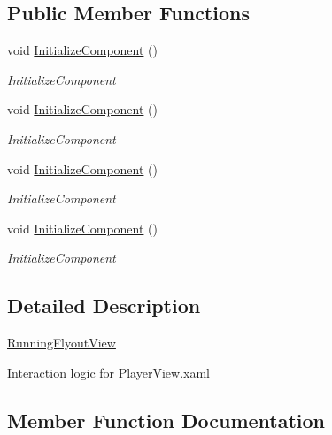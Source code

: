 \subsection*{Public Member Functions}
\begin{DoxyCompactItemize}
\item 
void \hyperlink{class_presentation_1_1_view_1_1_flyout_1_1_running_flyout_view_ac284f494bfae1a9a5f8a569710511379}{Initialize\+Component} ()
\begin{DoxyCompactList}\small\item\em Initialize\+Component \end{DoxyCompactList}\item 
void \hyperlink{class_presentation_1_1_view_1_1_flyout_1_1_running_flyout_view_ac284f494bfae1a9a5f8a569710511379}{Initialize\+Component} ()
\begin{DoxyCompactList}\small\item\em Initialize\+Component \end{DoxyCompactList}\item 
void \hyperlink{class_presentation_1_1_view_1_1_flyout_1_1_running_flyout_view_ac284f494bfae1a9a5f8a569710511379}{Initialize\+Component} ()
\begin{DoxyCompactList}\small\item\em Initialize\+Component \end{DoxyCompactList}\item 
void \hyperlink{class_presentation_1_1_view_1_1_flyout_1_1_running_flyout_view_ac284f494bfae1a9a5f8a569710511379}{Initialize\+Component} ()
\begin{DoxyCompactList}\small\item\em Initialize\+Component \end{DoxyCompactList}\end{DoxyCompactItemize}


\subsection{Detailed Description}
\hyperlink{class_presentation_1_1_view_1_1_flyout_1_1_running_flyout_view}{Running\+Flyout\+View} 

Interaction logic for Player\+View.\+xaml 

\subsection{Member Function Documentation}
\mbox{\label{class_presentation_1_1_view_1_1_flyout_1_1_running_flyout_view_ac284f494bfae1a9a5f8a569710511379}} 
